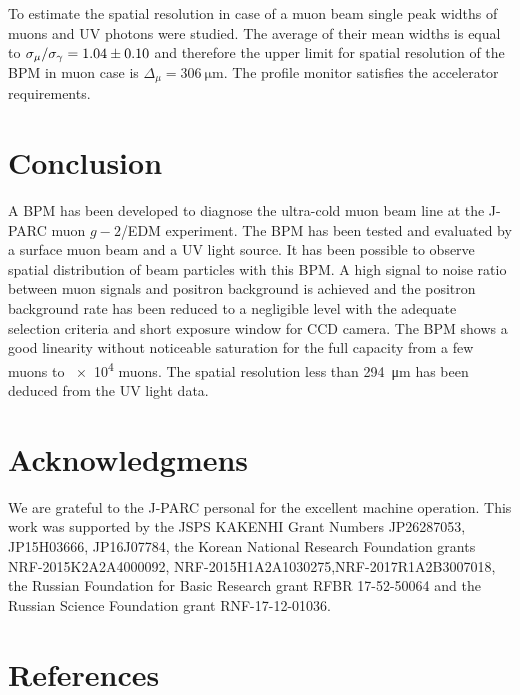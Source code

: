\documentclass[preprint,3p,twocolumn]{elsarticle}
\begin{document}
To estimate the spatial resolution in case of a muon beam single peak widths of muons and UV photons were studied.
The average of their mean widths is equal to
$\sigma_{\mu} / \sigma_{\gamma} = \num{1.04 \pm 0.10}$
and therefore the upper limit for spatial resolution of the BPM in muon case is
$\Delta_\mu = \SI{306}{\um}$.
The profile monitor satisfies the accelerator requirements.


\section{Conclusion}

A BPM has been developed to diagnose the ultra-cold muon beam line at the J-PARC muon $g-2$/EDM experiment. The BPM has been tested and evaluated by a surface muon beam and a UV light source.
It has been possible to observe spatial distribution of beam particles with this BPM.
A high signal to noise ratio between muon signals and positron background is achieved and the positron background rate has been reduced to a negligible level with the adequate selection criteria and short exposure window for CCD camera.
The BPM shows a good linearity without noticeable saturation for the full capacity from a few muons to \num{e4} muons. The spatial resolution less than \SI{294}{\micro\metre} has been deduced from the UV light data.


\section*{Acknowledgmens}

We are grateful to the J-PARC personal for the excellent machine operation.
This work was supported by 
the JSPS KAKENHI Grant Numbers JP26287053, JP15H03666, JP16J07784,
the Korean National Research Foundation grants NRF-2015K2A2A4000092, NRF-2015H1A2A1030275,NRF-2017R1A2B3007018,
the Russian Foundation for Basic Research grant RFBR 17-52-50064 and
the Russian Science Foundation grant RNF-17-12-01036. 

\section*{References}


\end{document}
